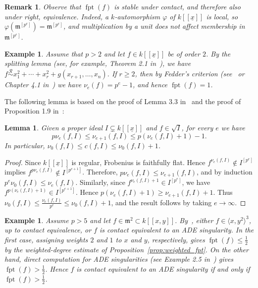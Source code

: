 \documentclass{article}
\newtheorem{lemma}[theorem]{Lemma}
\newtheorem{example}[theorem]{Example}
\newtheorem{remark}[theorem]{Remark}
\DeclareMathOperator{\fpt}{fpt}
\newcommand{\kx}{k[[\underline{x}]]}
\newcommand{\equivr}{\overset{\mathcal{R}}{\sim}}
\numberwithin{theorem}{section}
\begin{document}
\begin{remark}\label{rem:fpt_contact}
\textup{Observe that $\fpt(f)$ is stable under contact, and therefore also under right, equivalence. Indeed, a $k$-automorphism $\varphi$ of $\kx$ is local, so $\varphi(\mathfrak{m}^{[p^e]})=\mathfrak{m}^{[p^e]}$, and multiplication by a unit does not affect membership in $\mathfrak{m}^{[p^e]}$.}
\end{remark}

\begin{example}
\textup{Assume that $p>2$ and let $f\in\kx$ be of order $2$. By the splitting lemma (see, for example, Theorem 2.1 in~\cite{greuel2025splitting}), we have $f\equivr x_1^2+\cdots+x_r^2+g(x_{r+1},\dots,x_n)$. If $r\geq2$, then by Fedder's criterion (see~\cite{fedder1983F} or Chapter 4.1 in~\cite{schwede2024singularities}) we have $\nu_e(f)=p^e-1$, and hence $\fpt(f)=1$.}
\end{example}

The following lemma is based on the proof of Lemma 3.3 in~\cite{schwede2024singularities} and the proof of Proposition 1.9 in~\cite{mustata2005f}:

\begin{lemma}\label{lem:bound_c_nu}
Given a proper ideal $I\subsetneq\kx$ and $f\in\sqrt I$, for every $e$ we have
\[
    p\nu_e(f,I)\leq\nu_{e+1}(f,I)\leq p(\nu_e(f,I)+1)-1.
\]
In particular, $\nu_0(f,I)\leq c(f,I)\leq\nu_0(f,I)+1$.
\end{lemma}

\begin{proof}
Since $\kx$ is regular, Frobenius is faithfully flat. Hence $f^{\nu_e(f,I)}\notin I^{[p^e]}$ implies $f^{p\nu_e(f,I)}\notin I^{[p^{e+1}]}$. Therefore, $p\nu_e(f,I)\leq\nu_{e+1}(f,I)$, and by induction $p^e\nu_0(f,I)\leq\nu_e(f,I)$. Similarly, since $f^{\nu_e(f,I)+1}\in I^{[p^e]}$, we have $f^{p(\nu_e(f,I)+1)}\in I^{[p^{e+1}]}$. Hence $p(\nu_e(f,I)+1)\geq\nu_{e+1}(f,I)+1$. Thus $\nu_0(f,I)\leq\frac{\nu_e(f,I)}{p^e}\leq\nu_0(f,I)+1$, and the result follows by taking $e\to\infty$.
\end{proof}

\begin{example}
\textup{Assume $p>5$ and let $f\in\mathfrak{m}^2\subset k[[x,y]]$. By~\cite{greuel1990simple}, either $f\in\langle x,y^2\rangle^3$, up to contact equivalence, or $f$ is contact equivalent to an ADE singularity. In the first case, assigning weights $2$ and $1$ to $x$ and $y$, respectively, gives $\fpt(f)\leq\frac12$ by the weighted-degree estimate of Proposition~\ref{prop:weighted_fpt}. On the other hand, direct computation for ADE singularities (see Example 2.5 in~\cite{takagi2004f}) gives $\fpt(f)>\frac12$. Hence $f$ is contact equivalent to an ADE singularity if and only if $\fpt(f)>\frac12$.}
\end{example}
\end{document}
